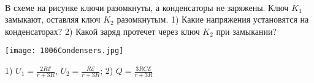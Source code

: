 \begin{ex} 
\hspace{0pt} \\
\begin{minipage}{.65\textwidth}
В схеме на рисунке ключи разомкнуты, а конденсаторы не заряжены. Ключ $K_1$ замыкают, оставляя ключ $K_2$ разомкнутым. 
1) Какие напряжения установятся на конденсаторах? 2) Какой заряд протечет через ключ $K_2$ при замыкании?
\end{minipage}
\begin{minipage}{.35\textwidth}
\centering
\texttt{[image: 1006Condensers.jpg]}
\end{minipage}
\begin{ans}
1) $U_1 = \frac{2R \mathcal{E}}{r+3R}$, $U_2 = \frac{R \mathcal{E}}{r+3R}$; 2) $Q=\frac{3RC\mathcal{E}}{r+3R}$
\end{ans}
\end{ex}